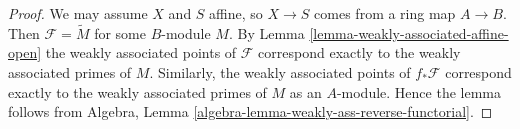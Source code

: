 \documentclass[10pt,a4paper]{amsart}
\theoremstyle{plain}
\theoremstyle{definition}
\theoremstyle{remark}
\numberwithin{equation}{subsection}
\begin{document}
\begin{proof}
We may assume $X$ and $S$ affine, so $X \to S$ comes from a ring map
$A \to B$. Then $\mathcal{F} = \widetilde M$ for some $B$-module $M$. By
Lemma \ref{lemma-weakly-associated-affine-open}
the weakly associated points of $\mathcal{F}$ correspond exactly to the
weakly associated primes of $M$. Similarly, the weakly associated points
of $f_*\mathcal{F}$ correspond exactly to the weakly associated primes
of $M$ as an $A$-module. Hence the lemma follows from
Algebra, Lemma \ref{algebra-lemma-weakly-ass-reverse-functorial}.
\end{proof}
\end{document}
